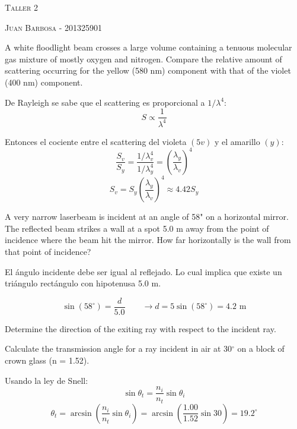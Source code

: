 \documentclass[addpoints,10pt]{exam}
\begin{document}
	\begin{center}
		\LARGE\scshape{Taller 2}
		
		\vspace{1cm}
		\large\scshape{Juan Barbosa - 201325901}
	\end{center}

	\begin{questions}
		{
			\question
			A white floodlight beam crosses a large volume containing a tenuous molecular gas mixture of mostly oxygen and nitrogen. Compare the relative amount of scattering occurring for the yellow (580 nm) component with that of the violet (400 nm) component.
		}
		
		De Rayleigh se sabe que el scattering es proporcional a $1/\lambda^4$:
		\begin{equation}
			S \propto \dfrac{1}{\lambda^4}
		\end{equation}
		
		Entonces el cociente entre el scattering del violeta $(5v)$ y el amarillo $(y)$:
		\begin{equation}
			\dfrac{S_v}{S_y} = \dfrac{1/\lambda_v^4}{1/\lambda_y^4} = \left(\dfrac{\lambda_y}{\lambda_v}\right)^4
		\end{equation}
		\begin{equation}
			S_v = S_y\left(\dfrac{\lambda_y}{\lambda_v}\right)^4 \approx 4.42S_y
		\end{equation}
		
		{
			\question
			A very narrow laserbeam is incident at an angle of 58" on a horizontal mirror. The reflected beam strikes a wall at a spot 5.0 m away from the point of incidence where the beam hit the mirror. How far	horizontally is the wall from that point of incidence?
		}
		
		El \'angulo incidente debe ser igual al reflejado. Lo cual implica que existe un tri\'angulo rect\'angulo con hipotenusa 5.0 m.
		
		\begin{equation}
		\sin(58^\circ) = \dfrac{d}{5.0} \qquad \longrightarrow d = 5\sin(58^\circ) = 4.2\text{ m}
		\end{equation}
		
		{
			\question
			Determine the direction of the exiting ray with respect to the incident ray.
		}
		
		{
			\question
			Calculate the transmission angle for a ray incident in air at 30$^\circ$ on a block of crown glass (n = 1.52).
		}
		
		Usando la ley de Snell:
		\begin{equation}\label{slope}
			\sin\theta_t = \dfrac{n_i}{n_t}\sin\theta_i
		\end{equation}
		\begin{equation}
			\theta_t = \arcsin\left(\dfrac{n_i}{n_t}\sin\theta_i\right) = \arcsin\left(\dfrac{1.00}{1.52}\sin30\right) = 19.2 ^\circ
		\end{equation}
		

\end{questions}
\end{document}
